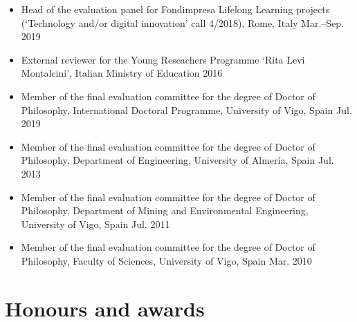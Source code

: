 \documentclass[11pt]{article}
\begin{document}
\begin{itemize}
    \item Head of the evaluation panel for Fondimpresa Lifelong Learning projects (`Technology and/or digital innovation' call 4/2018), Rome, Italy \hfill Mar.--Sep. 2019
		
    \item External reviewer for the Young Reseachers Programme ‘Rita Levi Montalcini’, Italian Ministry of Education \hfill 2016
		
    \item Member of the final evaluation committee for the degree of Doctor of Philosophy, International Doctoral Programme, University of Vigo, Spain \hfill Jul. 2019
		
    \item Member of the final evaluation committee for the degree of Doctor of Philosophy, Department of Engineering, University of Almería, Spain \hfill Jul. 2013
		
    \item Member of the final evaluation committee for the degree of Doctor of Philosophy, Department of Mining and Environmental Engineering, University of Vigo, Spain \hfill Jul. 2011
		
    \item Member of the final evaluation committee for the degree of Doctor of Philosophy, Faculty of Sciences, University of Vigo, Spain \hfill Mar. 2010 
\end{itemize}

\section*{Honours and awards}
\end{document}
